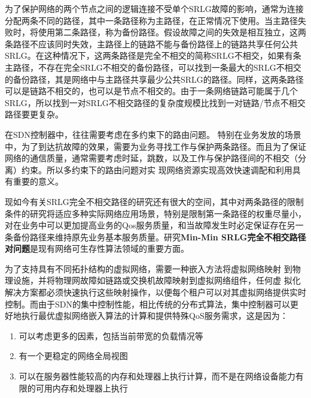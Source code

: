 为了保护网络的两个节点之间的逻辑连接不受单个SRLG故障的影响，通常为连接分配两条不同的路径，其中一条路径称为主路径，在正常情况下使用。当主路径失败时，将使用第二条路径，称为备份路径。假设故障之间的失效是相互独立，这两条路径不应该同时失效，主路径上的链路不能与备份路径上的链路共享任何公共SRLG。在这种情况下，这两条路径是完全不相交的简称SRLG不相交，如果有条主路径，不存在完全SRLG不相交的备份路径，可以找到一条最大的SRLG不相交的备份路径，其是网络中与主路径共享最少公共SRLG的路径\cite{rostami2012msdp}。同样，这两条路径可以是链路不相交的，也可以是节点不相交的。由于一条网络链路可能属于几个SRLG，所以找到一对SRLG不相交路径的复杂度规模比找到一对链路/节点不相交路径要更复杂。

在SDN控制器中，往往需要考虑在多约束下的路由问题\cite{akyildiz2014roadmap}。 特别在业务发放的场景中，为了到达抗故障的效果，需要为业务寻找工作与保护两条路径。而且为了保证网络的通信质量，通常需要考虑时延，跳数，以及工作与保护路径间的不相交（分离）约束。所以多约束下的路由问题对实 现网络资源实现高效快速调配和利用具有重要的意义。


现如今有关SRLG完全不相交路径的研究还有很大的空间，其中对两条路径的限制条件的研究将适应多种实际网络应用场景，特别是限制第一条路径的权重尽量小，对在业务中可以更加提高业务的Qos服务质量，和当故障发生时必定保证存在另一条备份路径来维持原先业务基本服务质量。研究\textbf{Min-Min SRLG完全不相交路径对问题}是现有网络可生存性算法领域的重要方面。





为了支持具有不同拓扑结构的虚拟网络，需要一种嵌入方法将虚拟网络映射 到物理设施，并将物理网故障如链路或交换机故障映射到虚拟网络组件，任何虚 拟化解决方案都必须快速执行这些映射操作，以便每个租户可以对其虚拟网络提供实时控制。而由于SDN的集中控制性能，相比传统的分布式算法，集中控制器可以更好地执行最优虚拟网络嵌入算法的计算和提供特殊QoS服务需求，这是因为：
\begin{enumerate}
  \item 可以考虑更多的因素，包括当前带宽的负载情况等
  \item 有一个更稳定的网络全局视图
  \item 可以在服务器性能较高的内存和处理器上执行计算，而不是在网络设备能力有限的可用内存和处理器上执行
\end{enumerate}

